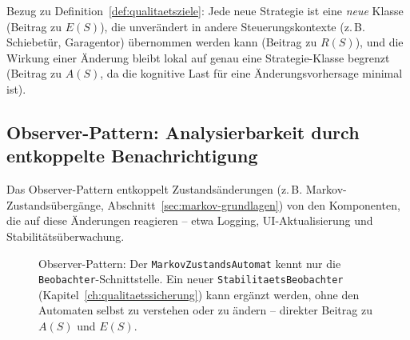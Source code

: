 ﻿\documentclass[a4paper,12pt]{report}
\theoremstyle{definition}
\begin{document}
\noindent
Bezug zu Definition~\ref{def:qualitaetsziele}: Jede neue Strategie ist eine
\emph{neue} Klasse (Beitrag zu $E(S)$), die unverändert in andere
Steuerungskontexte (z.\,B. Schiebetür, Garagentor) übernommen werden kann
(Beitrag zu $R(S)$), und die Wirkung einer Änderung bleibt lokal auf genau eine
Strategie-Klasse begrenzt (Beitrag zu $A(S)$, da die kognitive Last für eine
Änderungsvorhersage minimal ist).

\subsection{Observer-Pattern: Analysierbarkeit durch entkoppelte Benachrichtigung}

Das Observer-Pattern entkoppelt Zustandsänderungen (z.\,B. Markov-Zustandsübergänge,
Abschnitt~\ref{sec:markov-grundlagen}) von den Komponenten, die auf diese
Änderungen reagieren -- etwa Logging, UI-Aktualisierung und
Stabilitätsüberwachung.

\begin{figure}[H]
\centering
{}
\caption{Observer-Pattern: Der \texttt{MarkovZustandsAutomat} kennt nur die
\texttt{Beobachter}-Schnittstelle. Ein neuer \texttt{StabilitaetsBeobachter}
(Kapitel~\ref{ch:qualitaetssicherung}) kann ergänzt werden, ohne den Automaten
selbst zu verstehen oder zu ändern -- direkter Beitrag zu $A(S)$ und $E(S)$.}
\label{fig:observer-pattern}
\end{figure}
\end{document}
